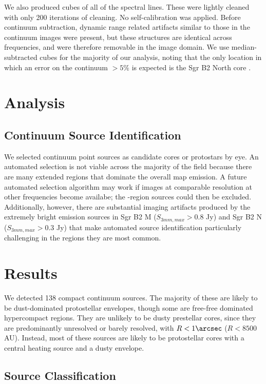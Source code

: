 \documentclass{emulateapj}
\newcommand{\ncores}{138\xspace}
\begin{document}
We also produced cubes of all of the spectral lines.  These were lightly
cleaned with only 200 iterations of cleaning.  No self-calibration was applied.
Before continuum subtraction, dynamic range related artifacts similar to those
in the continuum images were present, but these structures are identical across
frequencies, and were therefore removable in the image domain.  We use
median-subtracted cubes for the majority of our analysis, noting that the only
location in which an error on the continuum $>5\%$ is expected is the Sgr B2
North core \citep{Sanchez-Monge2017a}.

\section{Analysis}

\subsection{Continuum Source Identification}
We selected continuum point sources as candidate cores or protostars by eye.
An automated selection is not viable across the majority of the field because
there are many extended \hii regions that dominate the overall map emission.  A
future automated selection algorithm may work if images at comparable
resolution at other frequencies become availabe; the \hii-region sources could
then be excluded.  Additionally, however, there are substantial imaging
artifacts produced by the extremely bright emission sources in Sgr B2 M ($S_{3
mm,max} > 0.8$ Jy) and Sgr B2 N ($S_{3 mm,max} > 0.3$ Jy) that make automated
source identification particularly challenging in the regions they are most
common.

\section{Results}

We detected \ncores compact continuum sources.  The majority of these are
likely to be dust-dominated protostellar envelopes, though some are free-free
dominated hypercompact \hii regions.  They are unlikely to be dusty prestellar
cores, since they are predominantly unresolved or barely resolved, with
$R<1\arcsec$ ($R<8500$ AU).  Instead, most of these sources are likely to be
protostellar cores with a central heating source and a dusty envelope.

\subsection{Source Classification}
\end{document}
